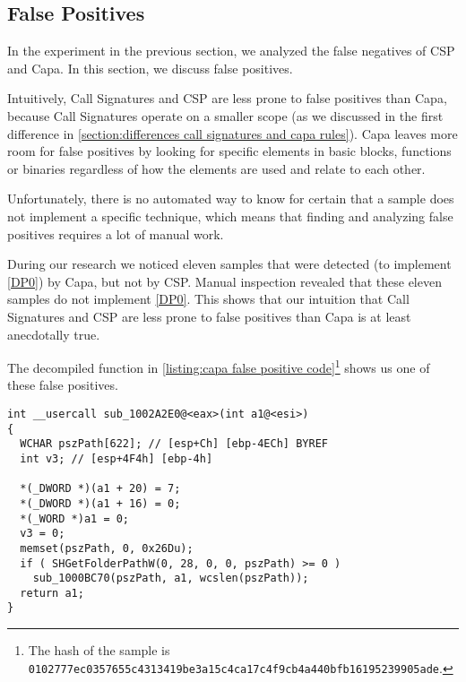 \subsection{False Positives}\label{section:capa false positives}
In the experiment in the previous section, we analyzed the false negatives of CSP and Capa. In this section, we discuss false positives.

Intuitively, Call Signatures and CSP are less prone to false positives than Capa, because Call Signatures operate on a smaller scope (as we discussed in the first difference in \autoref{section:differences call signatures and capa rules}). Capa leaves more room for false positives by looking for specific elements in basic blocks, functions or binaries regardless of how the elements are used and relate to each other.

\medskip

Unfortunately, there is no automated way to know for certain that a sample does not implement a specific technique, which means that finding and analyzing false positives requires a lot of manual work.

\medskip

During our research we noticed eleven samples that were detected (to implement \autoref{DP0}) by Capa, but not by CSP. Manual inspection revealed that these eleven samples do not implement \autoref{DP0}. This shows that our intuition that Call Signatures and CSP are less prone to false positives than Capa is at least anecdotally true.

The decompiled function in \autoref{listing:capa false positive code}\footnote{The hash of the sample is \tiny \texttt{0102777ec0357655c4313419be3a15c4ca17c4f9cb4a440bfb16195239905ade}.} shows us one of these false positives.

\begin{minipage}{0.9\textwidth}
\begin{lstlisting}[label={listing:capa false positive code}, caption={Pseudo code of a call to \texttt{SHGetFolderPath}, decompiled by IDA Pro.}, captionpos=b]
int __usercall sub_1002A2E0@<eax>(int a1@<esi>)
{
  WCHAR pszPath[622]; // [esp+Ch] [ebp-4ECh] BYREF
  int v3; // [esp+4F4h] [ebp-4h]

  *(_DWORD *)(a1 + 20) = 7;
  *(_DWORD *)(a1 + 16) = 0;
  *(_WORD *)a1 = 0;
  v3 = 0;
  memset(pszPath, 0, 0x26Du);
  if ( SHGetFolderPathW(0, 28, 0, 0, pszPath) >= 0 )
    sub_1000BC70(pszPath, a1, wcslen(pszPath));
  return a1;
}
\end{lstlisting}
\end{minipage}

